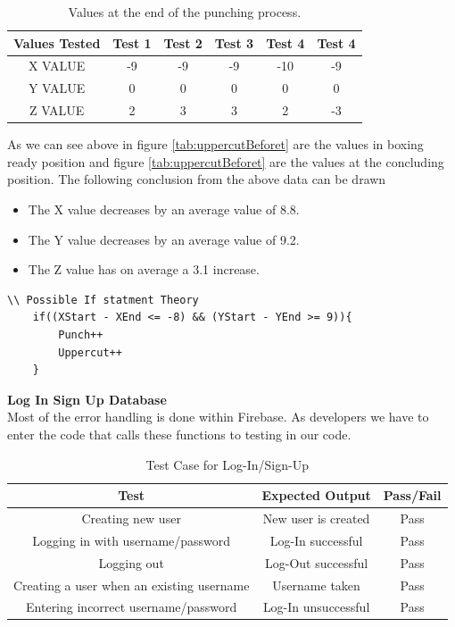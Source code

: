 \documentclass[a4paper,12pt]{report}
\begin{document}
\begin{table}[h]
    \centering
    \begin{tabular}{||c c c c c c||} 
     \hline
     \textbf{Values Tested} & \textbf{Test 1} & \textbf{Test 2} & \textbf{Test 3} & \textbf{Test 4} & \textbf{Test 4} \\ [0.5ex] 
     \hline\hline
     X VALUE & -9 & -9 & -9 & -10 & -9\\ 
     \hline
     Y VALUE & 0 & 0 & 0 & 0 & 0\\  
     \hline
     Z VALUE & 2 & 3 & 3 & 2 & -3\\
     \hline
    \end{tabular}
    \caption{Values at the end of the punching process.}
    \label{tab:vAfter}
\end{table}

As we can see above in figure \ref{tab:uppercutBeforet} are the values in boxing ready position and  figure \ref{tab:uppercutBeforet} are the values at the concluding position.
The following conclusion from the above data can be drawn 
\begin{itemize}
    \item The X value decreases by an average value of 8.8.
    \item The Y value decreases by an average value of 9.2.
    \item The Z value has on average a 3.1 increase.
\end{itemize}
\begin{verbatim}
\\ Possible If statment Theory
    if((XStart - XEnd <= -8) && (YStart - YEnd >= 9)){
        Punch++
        Uppercut++
    }
\end{verbatim}

\textbf{Log In Sign Up Database}\\
Most of the error handling is done within Firebase. As developers we have to enter the code that calls these functions to testing in our code. 

\begin{table}[h]
    \centering
    \begin{tabular}{||c c c||} 
     \hline
     \textbf{Test} & \textbf{Expected Output} & \textbf{Pass/Fail} \\ [0.5ex] 
     \hline\hline
     Creating new user & New user is created & Pass \\ 
     \hline
     Logging in with username/password & Log-In successful & Pass \\  
     \hline
     Logging out & Log-Out successful & Pass \\
     \hline
     Creating a user when an existing username & Username taken & Pass \\
     \hline
     Entering incorrect username/password & Log-In unsuccessful & Pass \\
     \hline
    \end{tabular}
    \caption{Test Case for Log-In/Sign-Up}
    \label{tab:LogInTest}
\end{table}
\end{document}
